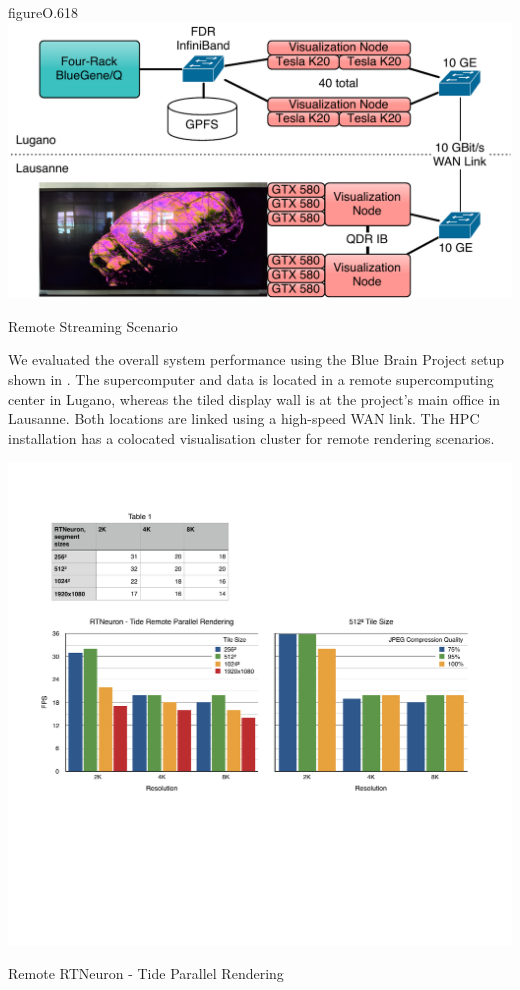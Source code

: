 \begin{wrapfloat}{figure}{O}{.618\textwidth}
  \includegraphics[width=.618\textwidth]{images/tideSetup}
  {\caption{\label{fTideSetup}Remote Streaming Scenario}}
\end{wrapfloat}

We evaluated the overall system performance using the Blue Brain Project setup
shown in . The supercomputer and data is located in a remote
supercomputing center in Lugano, whereas the tiled display wall is at the
project's main office in Lausanne. Both locations are linked using a high-speed
WAN link. The HPC installation has a colocated visualisation cluster for remote
rendering scenarios.

\begin{benchmark}[h!t]\center
  \includegraphics[width=\columnwidth]{results/tide}
  \caption{\label{rTide}Remote RTNeuron - Tide Parallel Rendering}
\end{benchmark}

